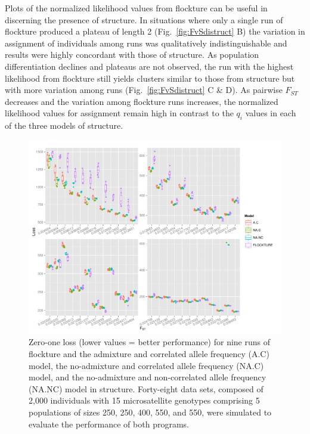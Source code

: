 Plots of the normalized likelihood values from {\sc flockture} can be useful in discerning the presence of 
structure.  In situations where only a single run of {\sc flockture} produced a plateau of length 2 
(Fig.~\ref{fig:FvSdistruct} B) the variation in assignment of individuals among runs was qualitatively indistinguishable
and results were highly concordant with those of {\sc structure}. As population differentiation declines 
and plateaus are not observed, the run with the highest likelihood from {\sc flockture} still yields
clusters similar to those from {\sc structure} but with more variation among runs (Fig.~\ref{fig:FvSdistruct} C \& D).
As pairwise $F_{ST}$ decreases and the variation among {\sc flockture} runs increases, the normalized likelihood
values for assignment remain high in contrast to the $q_i$ values in each of the three models of {\sc structure}. 

  \begin{figure}
\centering
\includegraphics[width=.9\linewidth]{images/Figures-Pat/uSatLoss.pdf}%
  \caption{Zero-one loss (lower values = better performance) for nine runs of {\sc flockture} and the admixture and correlated allele 
  frequency (A.C) model, the no-admixture and correlated allele frequency (NA.C) model, 
and the no-admixture and non-correlated allele frequency (NA.NC) model in {\sc structure}. Forty-eight 
data sets, composed of 2,000 individuals with 15 microsatellite genotypes comprising
5 populations of sizes 250, 250, 400, 550, and 550, were simulated to evaluate the performance
of both programs. }
  \label{fig:uSatLoss}
\end{figure} 

